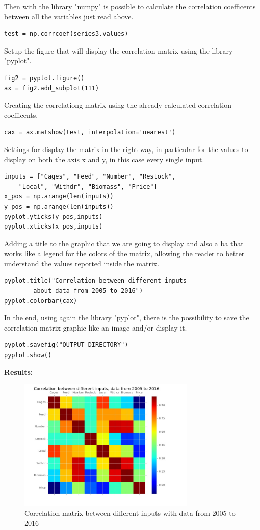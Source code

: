 Then with the library "numpy" is possible to calculate the correlation coefficents between all the variables just read above.
\begin{lstlisting}
test = np.corrcoef(series3.values)
\end{lstlisting}

Setup the figure that will display the correlation matrix using the library "pyplot".
\begin{lstlisting}
fig2 = pyplot.figure()
ax = fig2.add_subplot(111)
\end{lstlisting}

Creating the correlationg matrix using the already calculated correlation coefficents.
\begin{lstlisting}
cax = ax.matshow(test, interpolation='nearest')
\end{lstlisting}

Settings for display the matrix in the right way, in particular for the values to display on both the axis x and y, in this case every single input.
\begin{lstlisting}
inputs = ["Cages", "Feed", "Number", "Restock",
	"Local", "Withdr", "Biomass", "Price"]
x_pos = np.arange(len(inputs))
y_pos = np.arange(len(inputs))
pyplot.yticks(y_pos,inputs)
pyplot.xticks(x_pos,inputs)
\end{lstlisting}

Adding a title to the graphic that we are going to display and also a ba that works like a legend for the colors of the matrix, allowing the reader to better understand the values reported inside the matrix.
\begin{lstlisting}
pyplot.title("Correlation between different inputs 
		about data from 2005 to 2016")
pyplot.colorbar(cax)
\end{lstlisting}

In the end, using again the library "pyplot", there is the possibility to save the correlation matrix graphic like an image and/or display it.
\begin{lstlisting}
pyplot.savefig("OUTPUT_DIRECTORY")
pyplot.show()
\end{lstlisting}

\textbf{Results:} \\

\begin{figure}[H]
	\centering
    \includegraphics[width=0.75\textwidth]{Files/Total_Dataset_Years_Matrix.jpg}
    \caption{Correlation matrix between different inputs with data from 2005 to 2016}
\end{figure}



